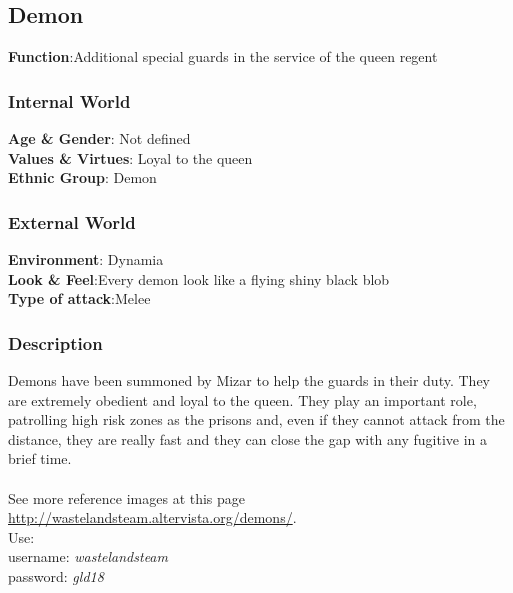\subsection{Demon}

\begin{minipage}{0.5\textwidth}
\textbf{Function}:Additional special guards in the service of the queen regent

\subsubsection{Internal World}

\textbf{Age \& Gender}: Not defined \\
\textbf{Values \& Virtues}: Loyal to the queen\\
\textbf{Ethnic Group}: Demon

\subsubsection{External World}
\textbf{Environment}: Dynamia \\
\textbf{Look \& Feel}:Every demon look like a flying shiny black blob\\
\textbf{Type of attack}:Melee \\
\end{minipage}%
%
\hfill\begin{minipage}{0.4\textwidth}
\end{minipage}


\subsubsection{Description}
Demons have been summoned by Mizar to help the guards in their duty. They are extremely obedient and loyal to the queen. They play an important role, patrolling high risk zones as the prisons and, even if they cannot attack from the distance, they are really fast and they can close the gap with any fugitive in a brief time.\\\\
See more reference images at this page \href{http://wastelandsteam.altervista.org/demons/}{http://wastelandsteam.altervista.org/demons/}.\\
Use:\\
username: \textit{wastelandsteam}\\
password: \textit{gld18}

